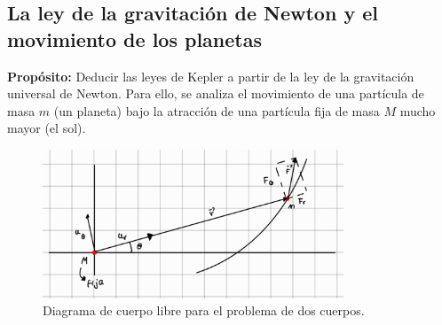 \subsection{La ley de la gravitación de Newton y el movimiento de los planetas}
\textbf{Propósito:} Deducir las leyes de Kepler a partir de la ley de la gravitación universal de Newton. Para ello, se analiza el movimiento de una partícula de masa $m$ (un planeta) bajo la atracción de una partícula fija de masa $M$ mucho mayor (el sol).

\begin{figure}[htbp]
    \centering
    \includegraphics[width=0.8\textwidth]{./Sessions/Two-Body-Problem/Images/simmons-img1.png}
    \caption{Diagrama de cuerpo libre para el problema de dos cuerpos.}
    \label{fig:dcl_2cuerpos}
\end{figure}

